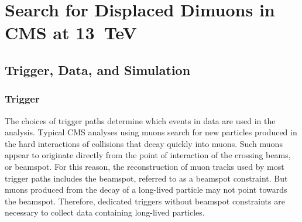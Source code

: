 \chapter{Search for Displaced Dimuons in CMS at 13~TeV}

\section{Trigger, Data, and Simulation}
\subsection{Trigger}
\label{sec:dd:Trigger}
The choices of trigger paths determine which events in data are used in the analysis.
Typical CMS analyses using muons search for new particles produced in the hard interactions of \pp collisions that decay quickly into muons.
Such muons appear to originate directly from the point of interaction of the crossing beams, or beamspot.
For this reason, the reconstruction of muon tracks used by most trigger paths includes the beamspot, referred to as a beamspot constraint.
But muons produced from the decay of a long-lived particle may not point towards the beamspot.
Therefore, dedicated triggers without beamspot constraints are necessary to collect data containing long-lived particles.

